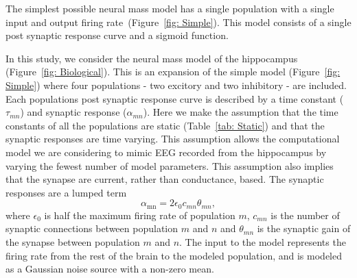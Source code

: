 The simplest possible neural mass model has a single population with a single input and output firing rate~(Figure~\ref{fig: Simple}). This model consists of a single post synaptic response curve and a sigmoid function.

In this study, we consider the neural mass model of the hippocampus (Figure~\ref{fig: Biological}). This is an expansion of the simple model (Figure~\ref{fig: Simple}) where four populations - two excitory and two inhibitory - are included. Each populations post synaptic response curve is described by a time constant ($\tau_{mn}$) and synaptic response ($\alpha_{mn}$). Here we make the assumption that the time constants of all the populations are static (Table~\ref{tab: Static}) and that the synaptic responses are time varying. This assumption allows the computational model we are considering to mimic EEG recorded from the hippocampus by varying the fewest number of model parameters. This assumption also implies that the synapse are current, rather than conductance, based. The synaptic responses are a lumped term
\begin{equation}\label{eq: Synaptic response}
    \alpha_{\mathrm{mn}} = 2\epsilon_{0}c_{mn}\theta_{mn},
\end{equation} where $\epsilon_0$ is half the maximum firing rate of population $m$, $c_{mn}$ is the number of synaptic connections between population $m$ and $n$ and $\theta_{mn}$ is the synaptic gain of the synapse between population $m$ and $n$. The input to the model represents the firing rate from the rest of the brain to the modeled population, and is modeled as a Gaussian noise source with a non-zero mean.

